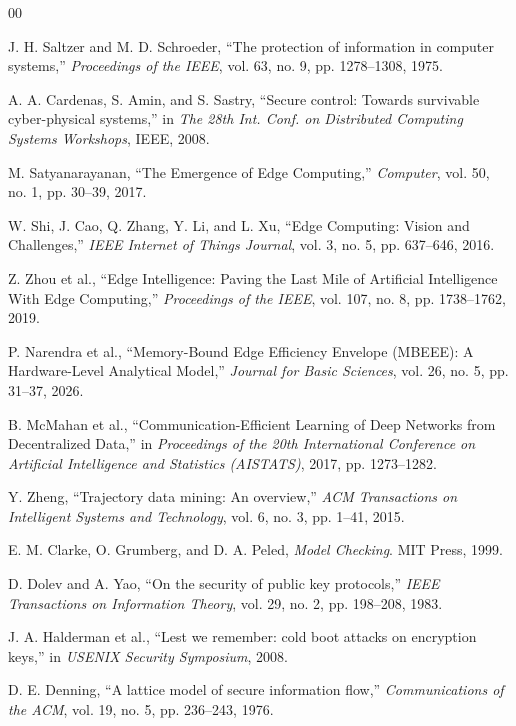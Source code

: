 \documentclass[conference]{IEEEtran}
\begin{document}
\begin{thebibliography}{00}

 J. H. Saltzer and M. D. Schroeder, ``The protection of information in computer systems,'' \textit{Proceedings of the IEEE}, vol. 63, no. 9, pp. 1278--1308, 1975.

 A. A. Cardenas, S. Amin, and S. Sastry, ``Secure control: Towards survivable cyber-physical systems,'' in \textit{The 28th Int. Conf. on Distributed Computing Systems Workshops}, IEEE, 2008.

 M. Satyanarayanan, ``The Emergence of Edge Computing,'' \textit{Computer}, vol. 50, no. 1, pp. 30--39, 2017.

 W. Shi, J. Cao, Q. Zhang, Y. Li, and L. Xu, ``Edge Computing: Vision and Challenges,'' \textit{IEEE Internet of Things Journal}, vol. 3, no. 5, pp. 637--646, 2016.

 Z. Zhou et al., ``Edge Intelligence: Paving the Last Mile of Artificial Intelligence With Edge Computing,'' \textit{Proceedings of the IEEE}, vol. 107, no. 8, pp. 1738--1762, 2019.

 P. Narendra et al., ``Memory-Bound Edge Efficiency Envelope (MBEEE): A Hardware-Level Analytical Model,'' \textit{Journal for Basic Sciences}, vol. 26, no. 5, pp. 31--37, 2026.

 B. McMahan et al., ``Communication-Efficient Learning of Deep Networks from Decentralized Data,'' in \textit{Proceedings of the 20th International Conference on Artificial Intelligence and Statistics (AISTATS)}, 2017, pp. 1273--1282.

 Y. Zheng, ``Trajectory data mining: An overview,'' \textit{ACM Transactions on Intelligent Systems and Technology}, vol. 6, no. 3, pp. 1--41, 2015.

 E. M. Clarke, O. Grumberg, and D. A. Peled, \textit{Model Checking}. MIT Press, 1999.

 D. Dolev and A. Yao, ``On the security of public key protocols,'' \textit{IEEE Transactions on Information Theory}, vol. 29, no. 2, pp. 198--208, 1983.

 J. A. Halderman et al., ``Lest we remember: cold boot attacks on encryption keys,'' in \textit{USENIX Security Symposium}, 2008.

 D. E. Denning, ``A lattice model of secure information flow,'' \textit{Communications of the ACM}, vol. 19, no. 5, pp. 236--243, 1976.


\end{thebibliography}
\end{document}
